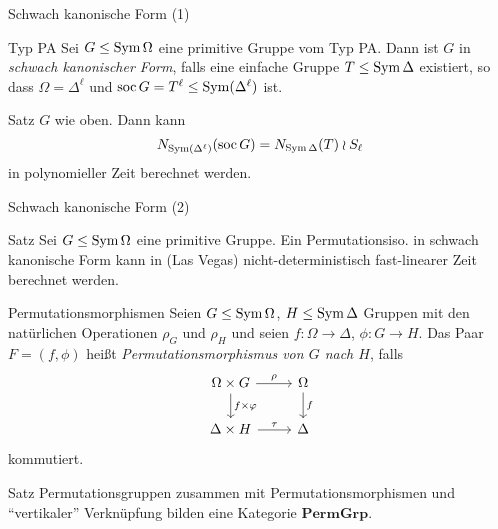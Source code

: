
\begin{frame}{Schwach kanonische Form (1)}
\begin{block}{Typ PA}
Sei $G \leq \operatorname{Sym} \Omega$ eine primitive Gruppe vom Typ PA.
\pause
Dann ist $G$ in \emph{schwach kanonischer Form}, falls
eine einfache Gruppe
$T \leq \operatorname{Sym} \Delta$
existiert,
so dass
$\Omega = \Delta ^ \ell$ und
$\operatorname{soc} G = T ^ \ell \leq \operatorname{Sym}( \Delta ^ \ell)$ ist.
\end{block}

\pause
\begin{block}{Satz}
$G$ wie oben. Dann kann
\[
    N_{\operatorname{Sym} (\Delta ^ \ell)}(\operatorname{soc} G) =
    N_{\operatorname{Sym} \Delta}(T) \wr S_\ell
\]
in polynomieller Zeit berechnet werden.
\end{block}
\end{frame}

\begin{frame}{Schwach kanonische Form (2)}
\begin{block}{Satz}
Sei $G \leq \operatorname{Sym} \Omega$ eine primitive Gruppe. Ein Permutationsiso. in schwach
kanonische Form kann in (Las Vegas) nicht-deterministisch fast-linearer Zeit
berechnet werden.
\end{block}
\end{frame}


\begin{frame}{Permutationsmorphismen}
Seien $G \leq \operatorname{Sym} \Omega$, $H \leq \operatorname{Sym} \Delta$ Gruppen
mit den natürlichen Operationen
$\rho_G$ und $\rho_H$
\pause
und
seien
$f : \Omega \to \Delta$, $\phi : G \to H$.
\pause
Das Paar $F = (f, \phi)$ heißt
\emph{Permutationsmorphismus von $G$ nach $H$},
falls
\[
\begin{tikzcd}[ampersand replacement=\&]
    \Omega \times G
        \ar[r, "\rho"]
        \ar[d, "f \times \varphi"]
    \&
    \Omega
        \ar[d, "f"]
    \\
    \Delta \times H
        \ar[r, "\tau"]
    \&
    \Delta
\end{tikzcd}
\]
kommutiert.

\pause
\begin{block}{Satz}
Permutationsgruppen zusammen mit Permutationsmorphismen und ``vertikaler''
Verknüpfung bilden eine Kategorie $\mathbf{PermGrp}$.
\end{block}
\end{frame}

